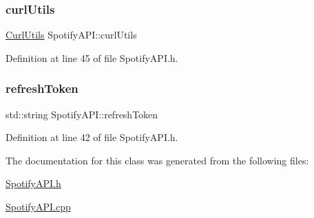 \subsubsection{\texorpdfstring{curl\+Utils}{curlUtils}}
{\footnotesize\ttfamily \mbox{\hyperlink{class_curl_utils}{Curl\+Utils}} Spotify\+A\+P\+I\+::curl\+Utils\hspace{0.3cm}{\ttfamily [private]}}



Definition at line 45 of file Spotify\+A\+P\+I.\+h.

\mbox{\label{class_spotify_a_p_i_a7d9fb5a2dd5ba6316b08f00837a49114}} 
\subsubsection{\texorpdfstring{refresh\+Token}{refreshToken}}
{\footnotesize\ttfamily std\+::string Spotify\+A\+P\+I\+::refresh\+Token\hspace{0.3cm}{\ttfamily [private]}}



Definition at line 42 of file Spotify\+A\+P\+I.\+h.



The documentation for this class was generated from the following files\+:\begin{DoxyCompactItemize}
\item 
\mbox{\hyperlink{_spotify_a_p_i_8h}{Spotify\+A\+P\+I.\+h}}\item 
\mbox{\hyperlink{_spotify_a_p_i_8cpp}{Spotify\+A\+P\+I.\+cpp}}\end{DoxyCompactItemize}
